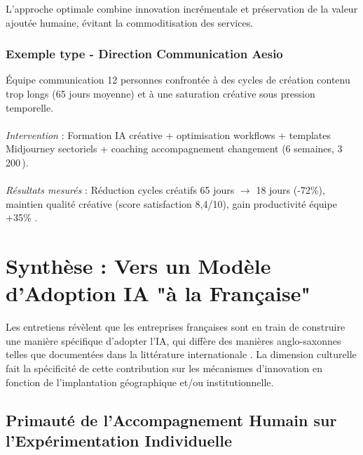L'approche optimale combine innovation incrémentale et préservation de la valeur ajoutée humaine, évitant la commoditisation des services.

\subsubsection{Exemple type - Direction Communication Aesio}
Équipe communication 12 personnes confrontée à des cycles de création contenu trop longs (65 jours moyenne) et à une saturation créative sous pression temporelle.
\\\\
\emph{Intervention} : Formation IA créative + optimisation workflows + templates Midjourney sectoriels + coaching accompagnement changement (6 semaines, 3\,200\,\texteuro{}).
\\\\
\emph{Résultats mesurés} : Réduction cycles créatifs 65 jours $\rightarrow$ 18 jours (-72\%), maintien qualité créative (score satisfaction 8{,}4/10), gain productivité équipe +35\% \cite{luwai2025aesio}.

\section{Synthèse : Vers un Modèle d'Adoption IA "à la Française"}

Les entretiens révèlent que les entreprises françaises sont en train de construire une manière spécifique d'adopter l'IA, qui diffère des manières anglo-saxonnes telles que documentées dans la littérature internationale \cite{rogers2003diffusion,moore2014crossing}. La dimension culturelle fait la spécificité de cette contribution sur les mécanismes d'innovation en fonction de l'implantation géographique et/ou institutionnelle.

\subsection{Primauté de l'Accompagnement Humain sur l'Expérimentation Individuelle}

